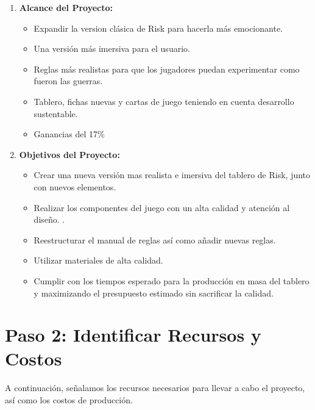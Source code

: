 \documentclass[12pt]{article}
\begin{document}
\begin{enumerate}
	\item \textbf{Alcance del Proyecto:} 

	\begin{itemize}
		\item Expandir la version clásica de Risk para hacerla más emocionante.

		\item Una versión más imersiva para el usuario.

		\item Reglas más realistas para que los jugadores puedan experimentar como fueron las guerras.

		\item Tablero, fichas nuevas y cartas de juego teniendo en cuenta desarrollo sustentable.

		\item Ganancias del 17\%

	\end{itemize}

	\item \textbf{Objetivos del Proyecto:}

	\begin{itemize}
		\item Crear una nueva versión mas realista e imersiva del tablero de Risk, junto con nuevos elementos.

		\item Realizar los componentes del juego con un alta calidad y atención al diseño.
		.
		\item Reestructurar el manual de reglas así como añadir nuevas reglas.

		\item Utilizar materiales de alta calidad.

		\item Cumplir con los tiempos esperado para la producción en masa del tablero y maximizando el presupuesto estimado sin sacrificar la calidad.

	\end{itemize}

\end{enumerate}


 \section*{Paso 2: Identificar Recursos y Costos}


A continuación, señalamos los recursos necesarios para llevar a cabo el proyecto, así como los costos de producción.
\end{document}
